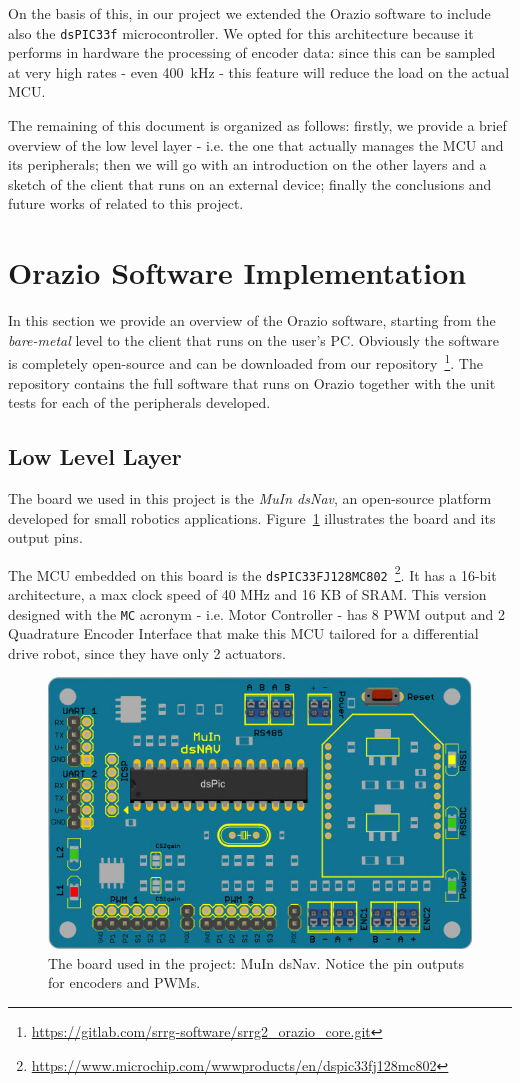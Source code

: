 \documentclass[10pt,a4paper, notitlepage]{report}
\begin{document}
On the basis of this, in our project we extended the Orazio software to include also the \texttt{dsPIC33f} microcontroller. We opted for this architecture because it performs in hardware the processing of encoder data: since this can be sampled at very high rates - even 400~kHz - this feature will reduce the load on the actual MCU.

The remaining of this document is organized as follows: firstly, we provide a brief overview of the low level layer - i.e. the one that actually manages the MCU and its peripherals; then we will go with an introduction on the other layers and a sketch of the client that runs on an external device; finally the conclusions and future works of related to this project.

\section*{Orazio Software Implementation} \label{sec:approach}
In this section we provide an overview of the Orazio software, starting from the \textit{bare-metal} level to the client that runs on the user's PC. Obviously the software is completely open-source and can be downloaded from our repository~\footnote{\href{https://gitlab.com/srrg-software/srrg2_orazio_core.git}{https://gitlab.com/srrg-software/srrg2\_orazio\_core.git}}. The repository contains the full software that runs on Orazio together with the unit tests for each of the peripherals developed.
\subsection*{Low Level Layer}
The board we used in this project is the \textit{MuIn dsNav}, an open-source platform developed for small robotics applications. Figure~\ref{fig:dsnav} illustrates the board and its output pins.

The MCU embedded on this board is the \texttt{dsPIC33FJ128MC802}~\footnote{\href{https://www.microchip.com/wwwproducts/en/dspic33fj128mc802}{https://www.microchip.com/wwwproducts/en/dspic33fj128mc802}}. It has a 16-bit architecture, a max clock speed of 40 MHz and 16 KB of SRAM. This version designed with the \texttt{MC} acronym - i.e. Motor Controller - has 8 PWM output and 2 Quadrature Encoder Interface that make this MCU tailored for a differential drive robot, since they have only 2 actuators.

\begin{figure}[!h]
  \centering
  \includegraphics[width=0.6\linewidth]{pics/dsnav_simple}
  \caption{The board used in the project: MuIn dsNav. Notice the pin outputs for encoders and PWMs.}
  \label{fig:dsnav}
\end{figure}
\end{document}
